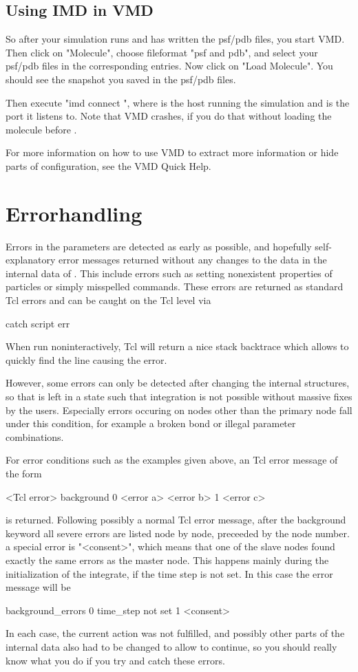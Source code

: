 \subsection{Using IMD in VMD}
So after your simulation runs and has written the psf/pdb files, you
start VMD. Then click on "Molecule", choose fileformat "psf and pdb",
and select your psf/pdb files in the corresponding entries. Now click
on "Load Molecule". You should see the snapshot you saved in the
psf/pdb files.

Then execute "imd connect  ", where  is
the host running the simulation and  is the port it listens
to. Note that VMD crashes, if you do that without loading the molecule
before .

For more information on how to use VMD to extract more information or
hide parts of configuration, see the VMD Quick Help.

\section{Errorhandling}
Errors in the parameters are detected as early as possible, and
hopefully self-explanatory error messages returned without any changes
to the data in the internal data of \es. This include errors such as
setting nonexistent properties of particles or simply misspelled
commands. These errors are returned as standard Tcl errors and can be
caught on the Tcl level via
\begin{tclcode}
catch {script} err 
\end{tclcode}
When run noninteractively, Tcl will return a nice stack backtrace
which allows to quickly find the line causing the error.

However, some errors can only be detected after changing the internal
structures, so that \es{} is left in a state such that integration is
not possible without massive fixes by the users. Especially errors
occuring on nodes other than the primary node fall under this
condition, for example a broken bond or illegal parameter
combinations.

For error conditions such as the examples given above, an Tcl error
message of the form
\begin{tclcode}
<Tcl error> background 0 {<error a>} {<error b>} 1 {<error c>}
\end{tclcode}
is returned. Following possibly a normal Tcl error message, after the
background keyword all severe errors are listed node by node,
preceeded by the node number. a special error is "<consent>", which
means that one of the slave nodes found exactly the same errors as the
master node. This happens mainly during the initialization of the
integrate, \eg if the time step is not set. In this case the error
message will be
\begin{tclcode}
background_errors 0 {time_step not set} 1 <consent> 
\end{tclcode}
In each case, the current action was not fulfilled, and possibly other
parts of the internal data also had to be changed to allow \es{} to
continue, so you should really know what you do if you try and catch
these errors.


